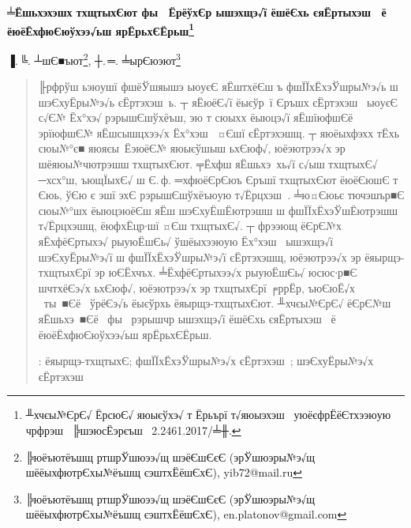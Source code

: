 \documentclass[12pt, a4paper, oneside]{article}
\begin{document}
\newtheorem{Th}{╥хюЁхьр}[section]%
\newtheorem{Def}{╬яЁхфхыхэшх}[section] %
\newtheorem{Lem}{╦хььр}[section]
\newtheorem{Ex}{╧ЁшьхЁ}[section]
\newtheorem{Zam}{╟рьхўрэшх}[section]
\newtheorem{Sle}{╤ыхфёЄтшх}[section]
\renewcommand{\abstractname}{}
\begin{center}
{\bf ╧Ёшьхэхэшх тхщтыхЄют фы  ЁрёўхЄр ышэхщэ√ї ёшёЄхь єяЁртыхэш   ё ёюёЁхфюЄюўхээ√ьш ярЁрьхЄЁрьш\footnote{╨хчєы№ЄрЄ√ ЁрсюЄ√ яюыєўхэ√ т Ёрьърї т√яюыэхэш  уюёєфрЁёЄтхээюую чрфрэш  ╠шэюсЁэрєъш \No~2.2461.2017/╧╫.}}\par
\bigskip
{▐.\,╚. ┴шЄ■ъют\footnote{╠юёъютёъшщ ртшрЎшюээ√щ шэёЄшЄєЄ (эрЎшюэры№э√щ шёёыхфютрЄхы№ёъшщ єэштхЁёшЄхЄ),  yib72@mail.ru}, ┼.\,═. ╧ырЄюэют\footnote{╠юёъютёъшщ ртшрЎшюээ√щ шэёЄшЄєЄ (эрЎшюэры№э√щ шёёыхфютрЄхы№ёъшщ єэштхЁёшЄхЄ),  en.platonov@gmail.com}}
\end{center}
\begin{abstract}
 ╟рфрўш ьэюушї фшёЎшяышэ ьюуєЄ яЁштхёЄш ъ фшЇЇхЁхэЎшры№э√ь ш шэЄхуЁры№э√ь єЁртэхэш ь. ┬ яЁюёЄ√ї ёыєўр ї Єръшх єЁртэхэш  ьюуєЄ с√Є№ Ёх°хэ√ рэрышЄшўхёъш, эю т сюыхх ёыюцэ√ї яЁшїюфшЄё  эрїюфшЄ№ яЁшсышцхээ√х Ёх°хэш  ¤Єшї єЁртэхэшщ. ┬ яюёыхфэхх тЁхь  сюы№°є■ яюяєы ЁэюёЄ№ яюыєўшыш ьхЄюф√, юёэютрээ√х эр шёяюы№чютрэшш тхщтыхЄют. ╤Ёхфш яЁшьхэ хь√ї с√ыш тхщтыхЄ√ ─хсх°ш, ъющЇыхЄ√ ш Є.\,ф. ═хфюёЄрЄюъ Єръшї тхщтыхЄют ёюёЄюшЄ т Єюь, ўЄю є эшї эхЄ рэрышЄшўхёъюую т√Ёрцхэш . ╧ю¤Єюьє тючэшър■Є сюы№°шх ёыюцэюёЄш яЁш шэЄхуЁшЁютрэшш ш фшЇЇхЁхэЎшЁютрэшш т√Ёрцхэшщ, ёюфхЁцр∙шї ¤Єш тхщтыхЄ√. ┬ фрээющ ёЄрЄ№х яЁхфёЄртыхэ√ рыуюЁшЄь√ ўшёыхээюую Ёх°хэш  ышэхщэ√ї шэЄхуЁры№э√ї ш фшЇЇхЁхэЎшры№э√ї єЁртэхэшщ, юёэютрээ√х эр ёяырщэ-тхщтыхЄрї эр юЄЁхчъх. ╧ЁхфёЄртыхээ√х рыуюЁшЄь√ юсюс∙р■Є шчтхёЄэ√х ьхЄюф√, юёэютрээ√х эр тхщтыхЄрї ╒ррЁр, ъюЄюЁ√х  ты ■Єё  ўрёЄэ√ь ёыєўрхь ёяырщэ-тхщтыхЄют. ╨хчєы№ЄрЄ√ ёЄрЄ№ш яЁшьхэ ■Єё  фы  рэрышчр ышэхщэ√ї ёшёЄхь єяЁртыхэш  ё ёюёЁхфюЄюўхээ√ьш ярЁрьхЄЁрьш.

: ёяырщэ-тхщтыхЄ; фшЇЇхЁхэЎшры№э√х єЁртэхэш ; шэЄхуЁры№э√х єЁртэхэш 
\end{abstract}
\end{document}
